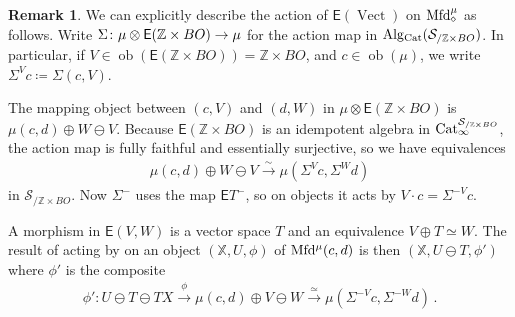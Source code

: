 \documentclass[10pt]{amsart}
\numberwithin{equation}{section}
\theoremstyle{definition}
\newtheorem{rem}[prop]{Remark}
\DeclareMathOperator{\ob}{ob}
\DeclareMathOperator{\Vect}{Vect}
\newcommand{\Cat}{\mathrm{Cat}\vphantom{t}}
\newcommand{\Mfd}{\mathrm{Mfd}\vphantom{d}}
\newcommand{\Alg}{\mathrm{Alg}\vphantom{z}}
\newcommand{\bZ}{\mathbb{Z}}
\newcommand{\bX}{\mathbb{X}}
\newcommand{\cS}{\mathcal{S}}
\newcommand{\sfE}{\mathsf{E}}
\renewcommand{\to}{\mathchoice{\longrightarrow}{\rightarrow}{}{}}
\begin{document}
\begin{rem}\label{rem:unwinding_EZxBO_action}
	We can explicitly describe the action of $\sfE(\Vect)$ on $\Mfd^{\mu}_{\diamond}$ as follows.
	Write $\Sigma\colon  \mu \otimes \sfE(\bZ \times BO) \to \mu$ for the action map in $\Alg_{\Cat}(\cS_{/\bZ\times BO})$.
	In particular, if $V\in \ob(\sfE(\bZ\times BO)) = \bZ\times BO$, and $c\in \ob(\mu)$, we write $\Sigma^{V}c \coloneq \Sigma(c,V)$.

	The mapping object between $(c,V)$ and $(d,W)$ in $\mu \otimes \sfE(\bZ\times BO)$ is $\mu(c,d)\oplus W\ominus V$.
  Because $\sfE(\bZ\times BO)$ is an idempotent algebra in $\Cat_{\infty}^{\cS_{/\bZ\times BO}}$, the action map is fully faithful and essentially surjective, so we have equivalences
	\begin{align*}
		\mu(c,d) \oplus W \ominus V \xrightarrow{\sim} \mu(\Sigma^{V}c, \Sigma^{W}d)
	\end{align*}
	in $\cS_{/\bZ\times BO}$.
  Now $\Sigma^{-}$ uses the map $\sfE T^{-}$, so on objects it acts by $V\cdot c =\Sigma^{-V}c$.

	A morphism in $\sfE(V,W)$ is a vector space $T$ and an equivalence $V\oplus T \simeq W$.
  The result of acting by on an object $(\bX, U, \phi)$ of $\Mfd^{\mu}(c,d)$ is then $(\bX, U\ominus T, \phi')$ where $\phi'$ is the composite
	\begin{align*}
		\phi' \colon U\ominus T  \ominus TX \xrightarrow{\phi } \mu(c,d)  \oplus V\ominus W \xrightarrow{\simeq} \mu(\Sigma^{-V}c, \Sigma^{-W}d) \,.
	\end{align*}
\end{rem}
\end{document}
